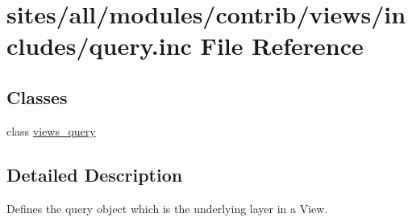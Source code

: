 \hypertarget{query_8inc}{
\section{sites/all/modules/contrib/views/includes/query.inc File Reference}
\label{query_8inc}
}
\subsection*{Classes}
\begin{CompactItemize}
\item 
class \hyperlink{classviews__query}{views\_\-query}
\end{CompactItemize}


\subsection{Detailed Description}
Defines the query object which is the underlying layer in a View. 